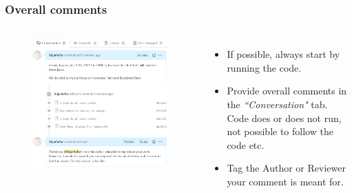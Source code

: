 \documentclass[aspectratio=169]{beamer}
\begin{document}
\begin{frame}
	\frametitle{Overall comments}
	\begin{columns}[c]
		
		\vspace{-.1cm}
		\begin{figure}
			\centering
			\includegraphics[width=.9\textwidth]{./img/pr-comment.png}
		\end{figure}
		
		\begin{itemize}
			\setlength\itemsep{1em}
			\item If possible, always start by running the code.
			\item Provide overall comments in the \textit{``Conversation"} tab. Code does or does not run, not possible to follow the code etc.
			\item Tag the Author or Reviewer your comment is meant for.
		\end{itemize}
		
	\end{columns}
\end{frame}
\end{document}

